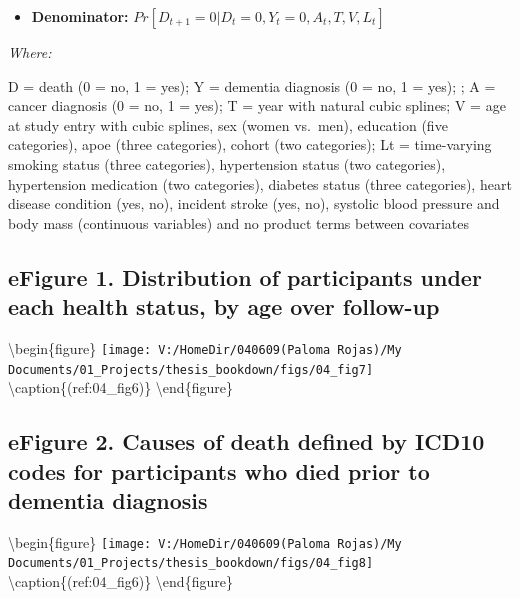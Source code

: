 \documentclass[
]{book}
\providecommand{\tightlist}{%
  \setlength{\itemsep}{0pt}\setlength{\parskip}{0pt}}
\begin{document}
\begin{itemize}
\tightlist
\item
  \textbf{Denominator:} \(Pr[D_{t+1} = 0|D_t = 0, Y_t = 0, A_t, T, V, L_t]\)
\end{itemize}

\emph{Where:}

D = death (0 = no, 1 = yes); Y = dementia diagnosis (0 = no, 1 = yes); ; A = cancer diagnosis (0 = no, 1 = yes); T = year with natural cubic splines; V = age at study entry with cubic splines, sex (women vs.~men), education (five categories), apoe (three categories), cohort (two categories); Lt = time-varying smoking status (three categories), hypertension status (two categories), hypertension medication (two categories), diabetes status (three categories), heart disease condition (yes, no), incident stroke (yes, no), systolic blood pressure and body mass (continuous variables) and no product terms between covariates

\newpage

\hypertarget{efigure-1.-distribution-of-participants-under-each-health-status-by-age-over-follow-up}{%
\subsection{eFigure 1. Distribution of participants under each health status, by age over follow-up}\label{efigure-1.-distribution-of-participants-under-each-health-status-by-age-over-follow-up}}

\textbackslash begin\{figure\}
\texttt{[image: V:/HomeDir/040609(Paloma Rojas)/My Documents/01\_Projects/thesis\_bookdown/figs/04\_fig7]} \textbackslash caption\{(ref:04\_fig6)\}\label{fig:unnamed-chunk-7}
\textbackslash end\{figure\}

\newpage

\hypertarget{efigure-2.-causes-of-death-defined-by-icd10-codes-for-participants-who-died-prior-to-dementia-diagnosis}{%
\subsection{eFigure 2. Causes of death defined by ICD10 codes for participants who died prior to dementia diagnosis}\label{efigure-2.-causes-of-death-defined-by-icd10-codes-for-participants-who-died-prior-to-dementia-diagnosis}}

\textbackslash begin\{figure\}
\texttt{[image: V:/HomeDir/040609(Paloma Rojas)/My Documents/01\_Projects/thesis\_bookdown/figs/04\_fig8]} \textbackslash caption\{(ref:04\_fig6)\}\label{fig:unnamed-chunk-8}
\textbackslash end\{figure\}
\end{document}
